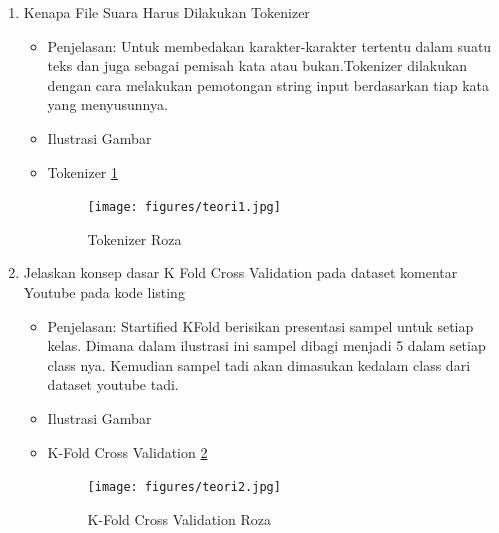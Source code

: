 \begin{enumerate}
\item Kenapa File Suara Harus Dilakukan Tokenizer
\begin{itemize}
\item Penjelasan: Untuk membedakan karakter-karakter tertentu dalam suatu teks dan juga sebagai pemisah kata atau bukan.Tokenizer dilakukan dengan cara melakukan pemotongan string input berdasarkan tiap kata yang menyusunnya.
\par 
\par
\item Ilustrasi Gambar
\item Tokenizer \ref{teori1}
\begin{figure}[!hbtp]
\centering
\texttt{[image: figures/teori1.jpg]}
\caption{Tokenizer Roza}
\label{teori1}
\end{figure}
\par
\end{itemize}
\par
\par

\item Jelaskan konsep dasar K Fold Cross Validation pada dataset komentar Youtube pada kode listing 

\begin{itemize}
\item Penjelasan: Startified KFold berisikan presentasi sampel untuk setiap kelas. Dimana dalam ilustrasi ini sampel dibagi menjadi 5 dalam setiap class nya. Kemudian sampel tadi akan dimasukan kedalam class dari dataset youtube tadi.
\par 
\par
\item Ilustrasi Gambar
\item K-Fold Cross Validation \ref{teori2}
\begin{figure}[!hbtp]
\centering
\texttt{[image: figures/teori2.jpg]}
\caption{K-Fold Cross Validation Roza}
\label{teori2}
\end{figure}
\par
\end{itemize}
\par
\par


\end{enumerate}
